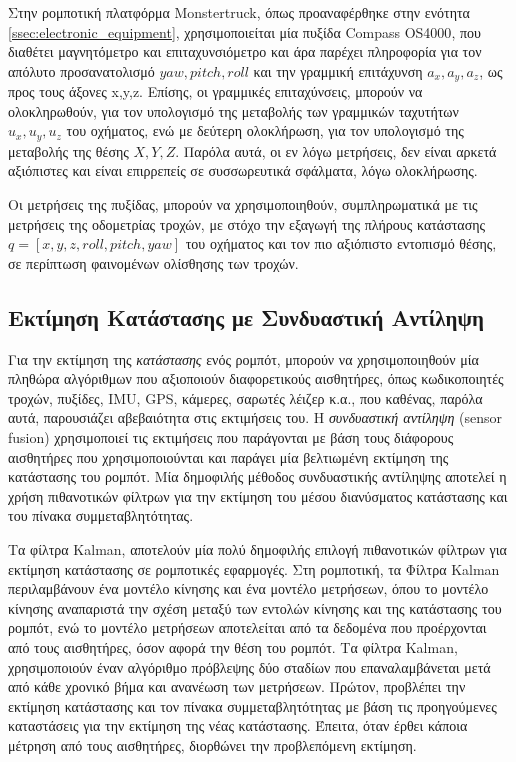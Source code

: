 \bigskip
Στην ρομποτική πλατφόρμα {Monstertruck}, όπως προαναφέρθηκε στην ενότητα \ref{ssec:electronic_equipment}, χρησιμοποιείται μία πυξίδα {Compass OS4000}, που διαθέτει μαγνητόμετρο και επιταχυνσιόμετρο και άρα παρέχει πληροφορία για τον απόλυτο προσανατολισμό $yaw, pitch, roll$ και την γραμμική επιτάχυνση $a_x, a_y, a_z$, ως προς τους άξονες x,y,z. Επίσης, οι γραμμικές επιταχύνσεις, μπορούν να ολοκληρωθούν, για τον υπολογισμό της μεταβολής των γραμμικών ταχυτήτων $u_x, u_y, u_z$ του οχήματος, ενώ με δεύτερη ολοκλήρωση, για τον υπολογισμό της μεταβολής της θέσης $X, Y, Z$. Παρόλα αυτά, οι εν λόγω μετρήσεις, δεν είναι αρκετά αξιόπιστες και είναι επιρρεπείς σε συσσωρευτικά σφάλματα, λόγω ολοκλήρωσης.

\bigskip
Οι μετρήσεις της πυξίδας, μπορούν να χρησιμοποιηθούν, συμπληρωματικά με τις μετρήσεις της {οδομετρίας τροχών}, με στόχο την εξαγωγή της πλήρους κατάστασης $q = [x, y, z, roll, pitch, yaw]$  του οχήματος και τον πιο αξιόπιστο εντοπισμό θέσης, σε περίπτωση φαινομένων ολίσθησης των τροχών.

\bigskip
\subsection{Εκτίμηση Κατάστασης με Συνδυαστική Αντίληψη} 
\label{ssec:state_estimation_and_sensor_fusion}
Για την εκτίμηση της \textit{κατάστασης} ενός ρομπότ, μπορούν να χρησιμοποιηθούν μία πληθώρα αλγόριθμων που αξιοποιούν διαφορετικούς αισθητήρες, όπως κωδικοποιητές τροχών, πυξίδες, IMU, GPS, κάμερες, σαρωτές λέιζερ  κ.α., που καθένας, παρόλα αυτά, παρουσιάζει αβεβαιότητα στις εκτιμήσεις του. Η \textit{συνδυαστική αντίληψη} ({sensor fusion}) χρησιμοποιεί τις εκτιμήσεις που παράγονται με βάση τους διάφορους αισθητήρες που χρησιμοποιούνται και παράγει μία βελτιωμένη εκτίμηση της κατάστασης του ρομπότ. Μία δημοφιλής μέθοδος συνδυαστικής αντίληψης αποτελεί η χρήση πιθανοτικών φίλτρων για την εκτίμηση του μέσου διανύσματος κατάστασης και του πίνακα συμμεταβλητότητας.

\bigskip
Τα φίλτρα Kalman, αποτελούν μία πολύ δημοφιλής επιλογή πιθανοτικών φίλτρων για εκτίμηση κατάστασης σε ρομποτικές εφαρμογές. Στη ρομποτική, τα {Φίλτρα Kalman} περιλαμβάνουν ένα μοντέλο κίνησης και ένα μοντέλο μετρήσεων, όπου το μοντέλο κίνησης αναπαριστά την σχέση μεταξύ των εντολών κίνησης και της κατάστασης του ρομπότ, ενώ το μοντέλο μετρήσεων αποτελείται από τα δεδομένα που προέρχονται από τους αισθητήρες, όσον αφορά την θέση του ρομπότ. Τα φίλτρα Kalman, χρησιμοποιούν έναν αλγόριθμο πρόβλεψης δύο σταδίων που επαναλαμβάνεται μετά από κάθε χρονικό βήμα και ανανέωση των μετρήσεων. Πρώτον, προβλέπει την εκτίμηση κατάστασης και τον πίνακα συμμεταβλητότητας με βάση τις προηγούμενες καταστάσεις για την εκτίμηση της νέας κατάστασης. Έπειτα, όταν έρθει κάποια μέτρηση από τους αισθητήρες, διορθώνει την προβλεπόμενη εκτίμηση.

